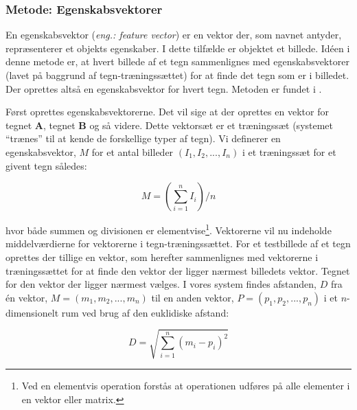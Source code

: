 
\subsubsection*{Metode: Egenskabsvektorer}
En egenskabsvektor (\textit{eng.: feature vector}) er en vektor der, som navnet antyder, repræsenterer et objekts egenskaber. I dette tilfælde er objektet et billede. Idéen i denne metode er, at hvert billede af et tegn sammenlignes med egenskabsvektorer (lavet på baggrund af tegn-træningssættet) for at finde det tegn som er i billedet. Der oprettes altså en egenskabsvektor for hvert tegn. Metoden er fundet i \cite{arth}.

Først oprettes egenskabsvektorerne. Det vil sige at der oprettes en vektor for tegnet \textbf{A}, tegnet \textbf{B} og så videre. Dette vektorsæt er et træningssæt (systemet ``trænes'' til at kende de forskellige typer af tegn). Vi definerer en egenskabsvektor, $M$ for et antal billeder $(I_{1},I_{2},...,I_{n})$ i et træningssæt for et givent tegn således:

\begin{displaymath}
	M = (\sum_{i=1}^{n}I_i)/n
\end{displaymath}


hvor både summen og divisionen er elementvise\footnote{Ved en elementvis operation forstås at operationen udføres på alle elementer i en vektor eller matrix.}. Vektorerne vil nu indeholde middelværdierne for vektorerne i tegn-træningssættet. For et testbillede af et tegn oprettes der tillige en vektor, som herefter sammenlignes med vektorerne i træningssættet for at finde den vektor der ligger nærmest billedets vektor. Tegnet for den vektor der ligger nærmest vælges. I vores system findes afstanden, $D$ fra én vektor, $M = (m_{1},m_{2},...,m_{n})$ til en anden vektor, $P = (p_{1},p_{2},...,p_{n})$ i et $n$-dimensionelt rum ved brug af den euklidiske afstand\cite{wiki_euclid}:

\begin{displaymath}
	D = \sqrt{\sum_{i=1}^{n}(m_{i}-p_{i})^{2}}
\end{displaymath}

